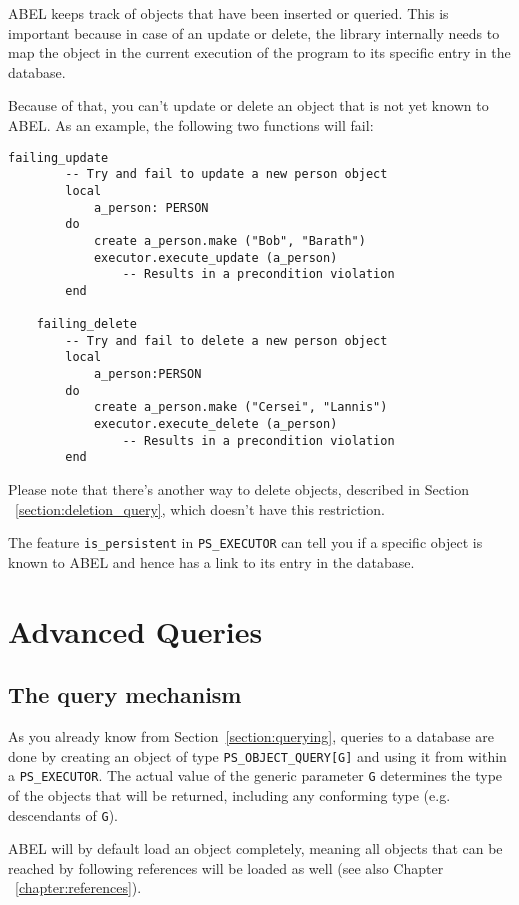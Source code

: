 \documentclass[a4paper,12pt]{report}
\begin{document}
ABEL keeps track of objects that have been inserted or queried.
This is important because in case of an update or delete, the library internally needs to map the object in the current execution of the program to its specific entry in the database.

Because of that, you can't update or delete an object that is not yet known to ABEL.
As an example, the following two functions will fail:

\begin{lstlisting}[language=OOSC2Eiffel, captionpos=b, caption={Failing updates and deletes.}, label={lst:failing_update_delete}]
	failing_update
		-- Try and fail to update a new person object
		local
			a_person: PERSON
		do
			create a_person.make ("Bob", "Barath")
			executor.execute_update (a_person)
				-- Results in a precondition violation
		end

	failing_delete
		-- Try and fail to delete a new person object
		local
			a_person:PERSON
		do
			create a_person.make ("Cersei", "Lannis")
			executor.execute_delete (a_person) 
				-- Results in a precondition violation
		end
\end{lstlisting}

Please note that there's another way to delete objects, described in Section ~\ref{section:deletion_query}, which doesn't have this restriction.

The feature \lstinline{is_persistent} in \lstinline!PS_EXECUTOR! can tell you if a specific object is known to ABEL and hence has a link to its entry in the database.

\chapter{Advanced Queries}
\label{sec:advanced_queries}

\section{The query mechanism}

As you already know from Section~\ref{section:querying}, queries to a database are done by creating an object of type  \lstinline!PS_OBJECT_QUERY[G]! and using it from within a \lstinline!PS_EXECUTOR!.
The actual value of the generic parameter \lstinline!G! determines the type of the objects that will be returned, including any conforming type (e.g. descendants of \lstinline!G!).

ABEL will by default load an object completely, meaning all objects that can be reached by following references will be loaded as well (see also Chapter ~\ref{chapter:references}).
\end{document}
